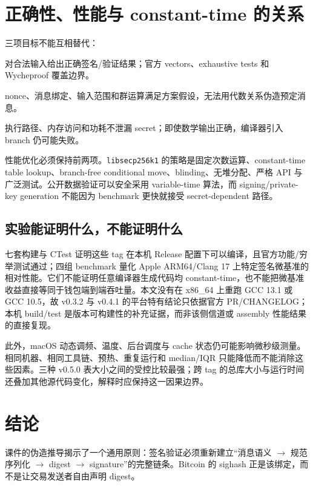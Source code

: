 \documentclass[11pt,a4paper,fontset=none]{ctexart}
\begin{document}
\section{正确性、性能与 constant-time 的关系}
\enlargethispage{2\baselineskip}

三项目标不能互相替代：

\begin{description}[style=nextline]
  \item[功能正确性] 对合法输入给出正确签名/验证结果；官方 vectors、exhaustive tests 和 Wycheproof 覆盖边界。
  \item[密码学安全性] nonce、消息绑定、输入范围和群运算满足方案假设，无法用代数关系伪造预定消息。
  \item[侧信道安全性] 执行路径、内存访问和功耗不泄漏 secret；即使数学输出正确，编译器引入 branch 仍可能失败。
\end{description}

性能优化必须保持前两项。\texttt{libsecp256k1} 的策略是固定次数运算、constant-time table lookup、branch-free conditional move、blinding、无堆分配、严格 API 与广泛测试。公开数据验证可以安全采用 variable-time 算法，而 signing/private-key generation 不能因为 benchmark 更快就接受 secret-dependent 路径。

\subsection{实验能证明什么，不能证明什么}

七套构建与 CTest 证明这些 tag 在本机 Release 配置下可以编译，且官方功能/穷举测试通过；四组 benchmark 量化 Apple ARM64/Clang 17 上特定签名微基准的相对性能。它们不能证明任意编译器生成代码均 constant-time，也不能把微基准收益直接等同于钱包端到端吞吐量。本文没有在 x86\_64 上重跑 GCC 13.1 或 GCC 10.5，故 v0.3.2 与 v0.4.1 的平台特有结论只依据官方 PR/CHANGELOG；本机 build/test 是版本可构建性的补充证据，而非该侧信道或 assembly 性能结果的直接复现。

此外，macOS 动态调频、温度、后台调度与 cache 状态仍可能影响微秒级测量。相同机器、相同工具链、预热、重复运行和 median/IQR 只能降低而不能消除这些因素。三种 v0.5.0 表大小之间的受控比较最强；跨 tag 的总库大小与运行时间还叠加其他源代码变化，解释时应保持这一因果边界。

\enlargethispage{2\baselineskip}
\section{结论}

课件的伪造推导揭示了一个通用原则：签名验证必须重新建立“消息语义 $\rightarrow$ 规范序列化 $\rightarrow$ digest $\rightarrow$ signature”的完整链条。Bitcoin 的 sighash 正是该绑定，而不是让交易发送者自由声明 digest。
\end{document}
